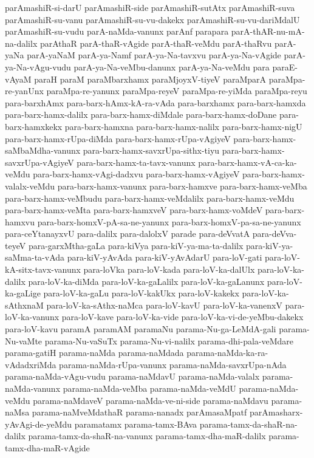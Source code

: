 {parAmashiR-si-darU
parAmashiR-side
parAmashiR-sutAtx
parAmashiR-suva
parAmashiR-su-vanu
parAmashiR-su-vu-dakekx
parAmashiR-su-vu-dariMdalU
parAmashiR-su-vudu
parA-naMda-vanunx
parAnf
parapara
parA-thAR-nu-mA-na-dalilx
parAthaR
parA-thaR-vAgide
parA-thaR-veMdu
parA-thaRvu
parA-yaNa
parA-yaNaM
parA-ya-Namf
parA-ya-Na-tavxvu
parA-ya-Na-vAgide
parA-ya-Na-vAgu-vudu
parA-ya-Na-veMbu-danunx
parA-ya-Na-veMdu
para
paraE-vAyaM
paraH
paraM
paraMbarxhamx
paraMjoyxV-tiyeV
paraMparA
paraMpa-re-yanUnx
paraMpa-re-yanunx
paraMpa-reyeV
paraMpa-re-yiMda
paraMpa-reyu
para-barxhAmx
para-barx-hAmx-kA-ra-vAda
para-barxhamx
para-barx-hamxda
para-barx-hamx-dalilx
para-barx-hamx-diMdale
para-barx-hamx-doDane
para-barx-hamxkekx
para-barx-hamxna
para-barx-hamx-nalilx
para-barx-hamx-nigU
para-barx-hamx-rUpa-diMda
para-barx-hamx-rUpa-vAgiyeV
para-barx-hamx-saMbaMdha-vanunx
para-barx-hamx-savxrUpa-sithx-tiyu
para-barx-hamx-savxrUpa-vAgiyeV
para-barx-hamx-ta-tavx-vanunx
para-barx-hamx-vA-ca-ka-veMdu
para-barx-hamx-vAgi-dadxvu
para-barx-hamx-vAgiyeV
para-barx-hamx-valalx-veMdu
para-barx-hamx-vanunx
para-barx-hamxve
para-barx-hamx-veMba
para-barx-hamx-veMbudu
para-barx-hamx-veMdalilx
para-barx-hamx-veMdu
para-barx-hamx-veMta
para-barx-hamxveV
para-barx-hamx-voMdeV
para-barx-hamxvu
para-barx-homxV-pA-sa-ne-yanunx
para-barx-homxV-pa-sa-ne-yanunx
para-ceYtanayxvU
para-dalilx
para-dalolxV
parade
para-deVvatA
para-deVva-teyeV
para-garxMtha-gaLa
para-kiVya
para-kiV-ya-ma-ta-dalilx
para-kiV-ya-saMma-ta-vAda
para-kiV-yAvAda
para-kiV-yAvAdarU
para-loV-gati
para-loV-kA-sitx-tavx-vanunx
para-loVka
para-loV-kada
para-loV-ka-dalUlx
para-loV-ka-dalilx
para-loV-ka-diMda
para-loV-ka-gaLalilx
para-loV-ka-gaLanunx
para-loV-ka-gaLige
para-loV-ka-gaLu
para-loV-kakUkx
para-loV-kakekx
para-loV-ka-sAthxnaM
para-loV-ka-sAthx-naMca
para-loV-kavU
para-loV-ka-vanenxV
para-loV-ka-vanunx
para-loV-kave
para-loV-ka-vide
para-loV-ka-vi-de-yeMbu-dakekx
para-loV-kavu
paramA
paramAM
paramaNu
parama-Nu-ga-LeMdA-gali
parama-Nu-vaMte
parama-Nu-vaSuTx
parama-Nu-vi-nalilx
parama-dhi-pala-veMdare
parama-gatiH
parama-naMda
parama-naMdada
parama-naMda-ka-ra-vAdadxriMda
parama-naMda-rUpa-vanunx
parama-naMda-savxrUpa-nAda
parama-naMda-vAgu-vudu
parama-naMdavU
parama-naMda-valalx
parama-naMda-vanunx
parama-naMda-veMba
parama-naMda-veMdU
parama-naMda-veMdu
parama-naMdaveV
parama-naMda-ve-ni-side
parama-naMdavu
parama-naMsa
parama-naMveMdathaR
parama-nanadx
parAmasaMpatf
parAmasharx-yAvAgi-de-yeMdu
paramatamx
parama-tamx-BAva
parama-tamx-da-shaR-na-dalilx
parama-tamx-da-shaR-na-vanunx
parama-tamx-dha-maR-dalilx
parama-tamx-dha-maR-vAgide
}
